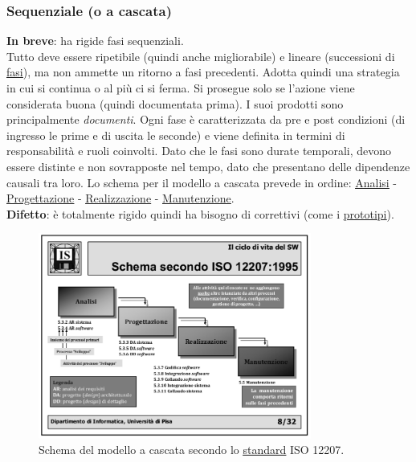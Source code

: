 			\subsubsection{Sequenziale (o a cascata)}  \label{msequenziale}
			\textbf{In breve}: ha rigide fasi sequenziali. \\
			 Tutto deve essere ripetibile (quindi anche migliorabile) e lineare (successioni di \underline{\hyperref[fase]{fasi}}), ma non ammette un ritorno a fasi precedenti. Adotta quindi una strategia in cui si continua o al più ci si ferma. Si prosegue solo se l'azione viene considerata buona (quindi documentata prima). I suoi prodotti sono principalmente \textit{documenti}. Ogni fase è caratterizzata da pre e post condizioni (di ingresso le prime e di uscita le seconde) e viene definita in termini di responsabilità e ruoli coinvolti. Dato che le fasi sono durate temporali, devono essere distinte e non sovrapposte nel tempo, dato che presentano delle dipendenze causali tra loro. Lo schema per il modello a cascata prevede in ordine: \underline{\hyperref[analisideirequisiti]{Analisi}} - \underline{\hyperref[progettazione]{Progettazione}} - \underline{\hyperref[realizzazione]{Realizzazione}} - \underline{\hyperref[manutenzione]{Manutenzione}}.  \\
			 \textbf{Difetto}: è totalmente rigido quindi ha bisogno di correttivi (come i \underline{\hyperref[prototipo]{prototipi}}).
			 
			 \begin{figure}[H]
			 	\centering
			 	\includegraphics[width=0.8\textwidth]{img/cascata}		
			 	\caption{Schema del modello a cascata secondo lo \underline{\hyperref[standard]{standard}} ISO 12207.}
			 \end{figure} 
			

